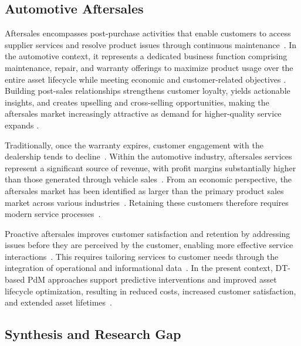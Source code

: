 \documentclass[conference,a4paper]{IEEEtran}
\begin{document}
\subsection{Automotive Aftersales}

Aftersales encompasses post-purchase activities that enable customers to access supplier services and resolve product issues through continuous maintenance~\cite{mertins_servitization_1999}. In the automotive context, it represents a dedicated business function comprising maintenance, repair, and warranty offerings to maximize product usage over the entire asset lifecycle while meeting economic and customer-related objectives \cite{sabbagha_impact_2016,balinado_effect_2021}. Building post-sales relationships strengthens customer loyalty, yields actionable insights, and creates upselling and cross-selling opportunities, making the aftersales market increasingly attractive as demand for higher-quality service expands \cite{sabbagha_impact_2016}.  

Traditionally, once the warranty expires, customer engagement with the dealership tends to decline~\cite{dat2026report}. Within the automotive industry, aftersales services represent a significant source of revenue, with profit margins substantially higher than those generated through vehicle sales~\cite{macbryde_role_2006}. From an economic perspective, the aftersales market has been identified as larger than the primary product sales market across various industries~\cite{bundschuh_how_2003,editorial_universitat_politecnica_de_valencia_impact_2015,wise_go_2000}. Retaining these customers therefore requires modern service processes~\cite{mertins_servitization_1999}.

Proactive aftersales improves customer satisfaction and retention by addressing issues before they are perceived by the customer, enabling more effective service interactions~\cite{challagalla_proactive_2009}. This requires tailoring services to customer needs through the integration of operational and informational data~\cite{mertins_servitization_1999}. In the present context, DT-based PdM approaches support predictive interventions and improved asset lifecycle optimization, resulting in reduced costs, increased customer satisfaction, and extended asset lifetimes~\cite{gonzalez-pridaDigitalTransformationAftersales2025}.


\subsection{Synthesis and Research Gap}
\end{document}
